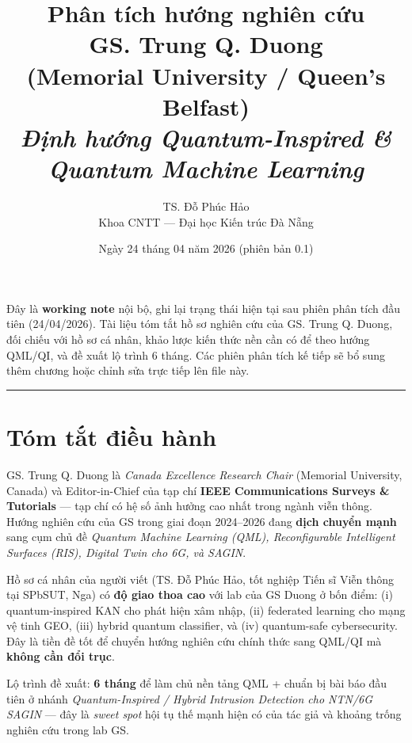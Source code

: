 \documentclass[11pt,a4paper]{article}
\title{\vspace{-1.5cm}\textbf{\color{accent} Phân tích hướng nghiên cứu} \\[3pt]
       \Large GS. Trung Q. Duong \\[2pt]
       \large (Memorial University / Queen's Belfast) \\[8pt]
       \normalsize \textit{Định hướng Quantum-Inspired \& Quantum Machine Learning}}
\author{TS. Đỗ Phúc Hảo \\ \small Khoa CNTT --- Đại học Kiến trúc Đà Nẵng}
\date{Ngày 24 tháng 04 năm 2026 (phiên bản 0.1)}
\begin{document}
\maketitle
\thispagestyle{fancy}

\begin{note}
Đây là \textbf{working note} nội bộ, ghi lại trạng thái hiện tại sau phiên phân tích đầu tiên (24/04/2026). Tài liệu tóm tắt hồ sơ nghiên cứu của GS. Trung Q. Duong, đối chiếu với hồ sơ cá nhân, khảo lược kiến thức nền cần có để theo hướng QML/QI, và đề xuất lộ trình 6 tháng. Các phiên phân tích kế tiếp sẽ bổ sung thêm chương hoặc chỉnh sửa trực tiếp lên file này.
\end{note}

\tableofcontents
\vspace{0.5cm}
\hrule
\vspace{0.5cm}

\section{Tóm tắt điều hành}

GS. Trung Q. Duong là \textit{Canada Excellence Research Chair} (Memorial University, Canada) và Editor-in-Chief của tạp chí \textbf{IEEE Communications Surveys \& Tutorials} --- tạp chí có hệ số ảnh hưởng cao nhất trong ngành viễn thông. Hướng nghiên cứu của GS trong giai đoạn 2024--2026 đang \textbf{dịch chuyển mạnh} sang cụm chủ đề \textit{Quantum Machine Learning (QML), Reconfigurable Intelligent Surfaces (RIS), Digital Twin cho 6G, và SAGIN}.

Hồ sơ cá nhân của người viết (TS. Đỗ Phúc Hảo, tốt nghiệp Tiến sĩ Viễn thông tại SPbSUT, Nga) có \textbf{độ giao thoa cao} với lab của GS Duong ở bốn điểm: (i) quantum-inspired KAN cho phát hiện xâm nhập, (ii) federated learning cho mạng vệ tinh GEO, (iii) hybrid quantum classifier, và (iv) quantum-safe cybersecurity. Đây là tiền đề tốt để chuyển hướng nghiên cứu chính thức sang QML/QI mà \textbf{không cần đổi trục}.

Lộ trình đề xuất: \textbf{6 tháng} để làm chủ nền tảng QML + chuẩn bị bài báo đầu tiên ở nhánh \textit{Quantum-Inspired / Hybrid Intrusion Detection cho NTN/6G SAGIN} --- đây là \textit{sweet spot} hội tụ thế mạnh hiện có của tác giả và khoảng trống nghiên cứu trong lab GS.

\end{document}
